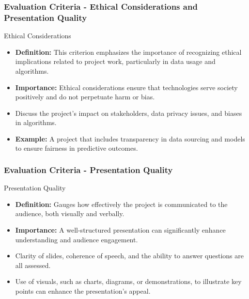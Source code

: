 \documentclass{beamer}
\begin{document}
\begin{frame}[fragile]
    \frametitle{Evaluation Criteria - Ethical Considerations and Presentation Quality}
    \begin{block}{Ethical Considerations}
        \begin{itemize}
            \item \textbf{Definition:} This criterion emphasizes the importance of recognizing ethical implications related to project work, particularly in data usage and algorithms.
            \item \textbf{Importance:} Ethical considerations ensure that technologies serve society positively and do not perpetuate harm or bias.
        \end{itemize}
    \end{block}
    \begin{itemize}
        \item Discuss the project's impact on stakeholders, data privacy issues, and biases in algorithms.
        \item \textbf{Example:} A project that includes transparency in data sourcing and models to ensure fairness in predictive outcomes.
    \end{itemize}
\end{frame}

\begin{frame}[fragile]
    \frametitle{Evaluation Criteria - Presentation Quality}
    \begin{block}{Presentation Quality}
        \begin{itemize}
            \item \textbf{Definition:} Gauges how effectively the project is communicated to the audience, both visually and verbally.
            \item \textbf{Importance:} A well-structured presentation can significantly enhance understanding and audience engagement.
        \end{itemize}
    \end{block}
    \begin{itemize}
        \item Clarity of slides, coherence of speech, and the ability to answer questions are all assessed.
        \item Use of visuals, such as charts, diagrams, or demonstrations, to illustrate key points can enhance the presentation’s appeal.
    \end{itemize}
\end{frame}
\end{document}
